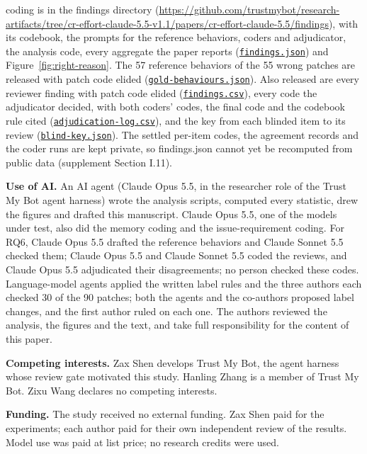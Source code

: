 \documentclass[sigconf,nonacm]{acmart}
\newcommand{\code}[1]{\texttt{#1}}
\begin{document}
coding is in the findings directory (\url{https://github.com/trustmybot/research-artifacts/tree/cr-effort-claude-5.5-v1.1/papers/cr-effort-claude-5.5/findings}), with its codebook, the prompts for the reference behaviors, coders and adjudicator, the analysis code, every aggregate the paper reports (\href{https://github.com/trustmybot/research-artifacts/blob/cr-effort-claude-5.5-v1.1/papers/cr-effort-claude-5.5/findings/artifact/outputs/findings.json}{\code{findings.json}}) and Figure~\ref{fig:right-reason}. The 57 reference behaviors of the 55 wrong patches are released with patch code elided (\href{https://github.com/trustmybot/research-artifacts/blob/cr-effort-claude-5.5-v1.1/papers/cr-effort-claude-5.5/findings/artifact/data/gold-behaviours.json}{\code{gold-behaviours.json}}). Also released are every reviewer finding with patch code elided (\href{https://github.com/trustmybot/research-artifacts/blob/cr-effort-claude-5.5-v1.1/papers/cr-effort-claude-5.5/findings/artifact/data/findings.csv}{\code{findings.csv}}), every code the adjudicator decided, with both coders' codes, the final code and the codebook rule cited (\href{https://github.com/trustmybot/research-artifacts/blob/cr-effort-claude-5.5-v1.1/papers/cr-effort-claude-5.5/findings/artifact/data/adjudication-log.csv}{\code{adjudication-log.csv}}), and the key from each blinded item to its review (\href{https://github.com/trustmybot/research-artifacts/blob/cr-effort-claude-5.5-v1.1/papers/cr-effort-claude-5.5/findings/artifact/data/blind-key.json}{\code{blind-key.json}}). The settled per-item codes, the agreement records and the coder runs are kept private, so findings.json cannot yet be recomputed from public data (supplement Section I.11).

\begin{acks}
\textbf{Use of AI.} An AI agent (Claude Opus 5.5, in the researcher role of the Trust My Bot agent harness) wrote the analysis scripts, computed every statistic, drew the figures and drafted this manuscript. Claude Opus 5.5, one of the models under test, also did the memory coding and the issue-requirement coding. For RQ6, Claude Opus 5.5 drafted the reference behaviors and Claude Sonnet 5.5 checked them; Claude Opus 5.5 and Claude Sonnet 5.5 coded the reviews, and Claude Opus 5.5 adjudicated their disagreements; no person checked these codes. Language-model agents applied the written label rules and the three authors each checked 30 of the 90 patches; both the agents and the co-authors proposed label changes, and the first author ruled on each one. The authors reviewed the analysis, the figures and the text, and take full responsibility for the content of this paper.

\textbf{Competing interests.} Zax Shen develops Trust My Bot, the agent harness whose review gate motivated this study. Hanling Zhang is a member of Trust My Bot. Zixu Wang declares no competing interests.

\textbf{Funding.} The study received no external funding. Zax Shen paid for the experiments; each author paid for their own independent review of the results. Model use was paid at list price; no research credits were used.
\end{acks}



\end{document}
